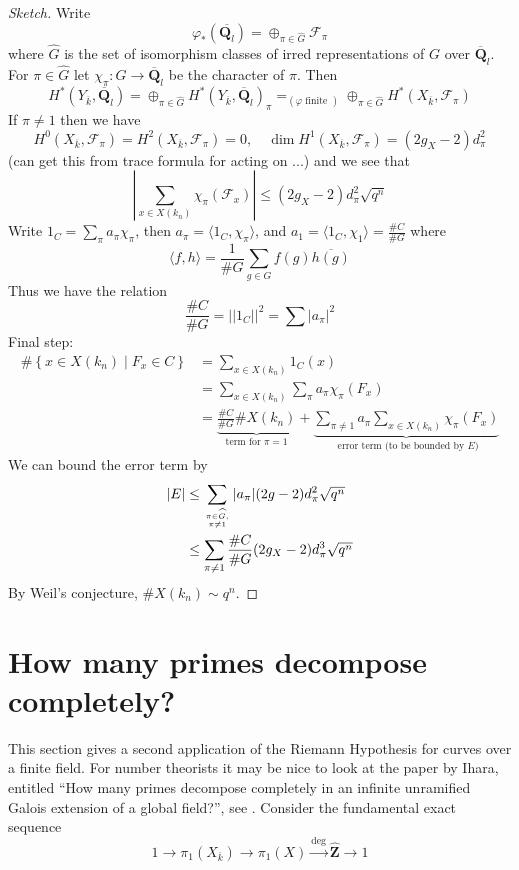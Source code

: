 \documentclass{stacks-project}
\theoremstyle{plain}
\theoremstyle{definition}
\theoremstyle{remark}
\numberwithin{equation}{subsection}
\begin{document}
\begin{proof}[Sketch]
Write
$$
\varphi_*(\overline{\mathbf{Q}_l}) =
\oplus_{\pi \in \widehat{G}} \mathcal{F}_{\pi}
$$
where $\widehat{G}$ is the set of isomorphism
classes of irred representations of
$G$ over $\overline{\mathbf{Q}}_l$. For $\pi \in \widehat{G}$
let $\chi_{\pi}: G \to \overline{\mathbf{Q}}_l$
be the character of $\pi$. Then
$$
H^*(Y_{\overline{k}}, \overline{\mathbf{Q}}_l) =
\oplus_{\pi\in \widehat{G}}
H^*(Y_{\overline{k}}, \overline{\mathbf{Q}}_l)_\pi
=_{(\varphi\text{ finite })}
\oplus_{\pi\in \widehat{G}}
H^*(X_{\overline{k}}, \mathcal{F}_\pi)
$$
If $\pi\neq 1$ then we have
$$
H^0(X_{\overline{k}}, \mathcal{F}_\pi) =
H^2(X_{\overline{k}}, \mathcal{F}_\pi) = 0,\quad
\dim H^1(X_{\overline{k}}, \mathcal{F}_\pi) = (2g_X - 2)d_\pi^2
$$
(can get this from trace formula for acting on ...) and we see that
$$
|\sum_{x \in X(k_n)} \chi_\pi(\mathcal{F}_x)| \leq
(2g_X - 2) d_\pi^2\sqrt{q^n}
$$
Write $1_C = \sum_\pi a_\pi \chi_\pi$, then
$a_\pi = \langle 1_C, \chi_\pi\rangle$, and
$a_1 = \langle 1_C, \chi_1\rangle = \frac{\# C}{\# G}$ where
$$
\langle f, h\rangle = \frac{1}{\# G}\sum_{g \in G} f(g)\overline{h(g)}
$$
Thus we have the relation
$$
\frac{\# C}{\# G} = ||1_C||^2 = \sum|a_\pi|^2
$$
Final step:
\begin{align*}
\#\left\{x \in X(k_n) \mid F_x \in C\right\}
& =
\sum_{x \in X(k_n)} 1_C(x) \\
& =
\sum_{x \in X(k_n)} \sum_\pi a_\pi \chi_\pi(F_x) \\
& =
\underbrace{\frac{\# C}{\# G} \# X(k_n)}_{
\text{term for }\pi = 1}
+
\underbrace{\sum_{\pi\neq 1}a_\pi\sum_{x\in X(k_n)}\chi_\pi(F_x)}_{
\text{ error term (to be bounded by }E)}
\end{align*}
We can bound the error term by
\begin{align*}
|E|
& \leq
\sum_{\pi \in \widehat{G}, \atop \pi \neq 1}
|a_\pi| (2g - 2) d_\pi^2 \sqrt{q^n} \\
& \leq
\sum_{\pi \neq 1} \frac{\# C}{\# G} (2g_X - 2) d_\pi^3 \sqrt{q^n}
\end{align*}
By Weil's conjecture, $\# X(k_n)\sim q^n$.
\end{proof}



\section{How many primes decompose completely?}
\label{section-how-many}

\noindent
This section gives a second application of the Riemann Hypothesis for
curves over a finite field. For number theorists it may be nice
to look at the paper by Ihara, entitled
``How many primes decompose completely in an infinite unramified Galois
extension of a global field?'', see \cite{Ihara}.
Consider the fundamental exact sequence
$$
1 \to
\pi_1(X_{\overline{k}}) \to
\pi_1(X) \xrightarrow{\deg}
\widehat{\mathbf{Z}} \to 1
$$
\end{document}
